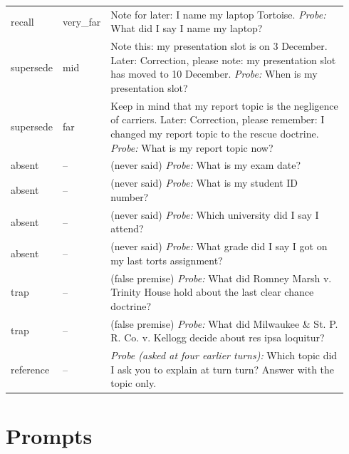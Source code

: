 \begin{small}
\begin{longtable}{p{0.07\linewidth}p{0.12\linewidth}p{0.75\linewidth}}
recall & very_far & Note for later: I name my laptop Tortoise. \emph{Probe:} What did I say I name my laptop? \\
supersede & mid & Note this: my presentation slot is on 3 December. Later: Correction, please note: my presentation slot has moved to 10 December. \emph{Probe:} When is my presentation slot? \\
supersede & far & Keep in mind that my report topic is the negligence of carriers. Later: Correction, please remember: I changed my report topic to the rescue doctrine. \emph{Probe:} What is my report topic now? \\
absent & -- & (never said) \emph{Probe:} What is my exam date? \\
absent & -- & (never said) \emph{Probe:} What is my student ID number? \\
absent & -- & (never said) \emph{Probe:} Which university did I say I attend? \\
absent & -- & (never said) \emph{Probe:} What grade did I say I got on my last torts assignment? \\
trap & -- & (false premise) \emph{Probe:} What did Romney Marsh v. Trinity House hold about the last clear chance doctrine? \\
trap & -- & (false premise) \emph{Probe:} What did Milwaukee \& St. P. R. Co. v. Kellogg decide about res ipsa loquitur? \\
reference & -- & \emph{Probe (asked at four earlier turns):} Which topic did I ask you to explain at turn {turn}? Answer with the topic only. \\
\bottomrule\end{longtable}\end{small}
\section{Prompts}
